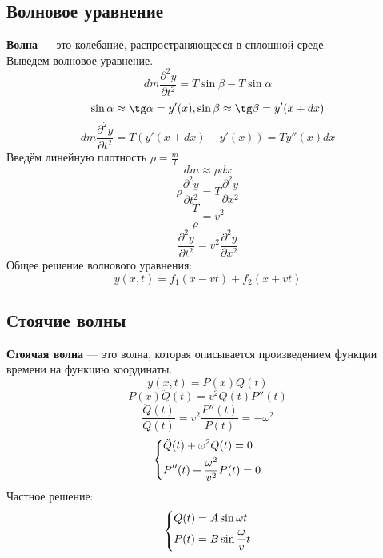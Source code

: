 \documentclass[fleqn,a4paper,12pt,titlepage,finall]{article}
\begin{document}
\subsection{Волновое уравнение}
{\bf Волна} --- это колебание, распространяющееся в сплошной среде. \\
Выведем волновое уравнение.
\[dm \frac{\partial^2 y}{\partial t^2} = T\sin\beta - T\sin\alpha\]
\[\sin\alpha \approx \tg\alpha = y'(x), \sin\beta \approx \tg\beta = y'(x+dx)\]
\[dm \frac{\partial^2 y}{\partial t^2} = T(y'(x+dx) - y'(x)) = Ty''(x)dx\]
Введём линейную плотность $\rho = \frac{m}{l}$
\[dm \approx \rho dx\]
\[\rho \frac{\partial^2 y}{\partial t^2} = T\frac{\partial^2 y}{\partial x^2}\]
\[\frac{T}{\rho} = v^2\]
\[\boxed{\frac{\partial^2 y}{\partial t^2} = v^2\frac{\partial^2 y}{\partial
x^2}}\]
Общее решение волнового уравнения:
\[y(x, t) = f_1(x-vt) + f_2(x+vt)\]
\subsection{Стоячие волны}
{\bf Стоячая волна} --- это волна, которая описывается произведением функции
времени на функцию координаты.
\[y(x, t) = P(x)Q(t)\]
\[P(x)\ddot{Q}(t) = v^2Q(t)P''(t)\]
\[\frac{\ddot{Q}(t)}{Q(t)} = v^2\frac{P''(t)}{P(t)} = -\omega^2\]
\[\begin{dcases}
	\ddot{Q}(t) + \omega^2Q(t) = 0 \\
	P''(t) + \frac{\omega^2}{v^2}P(t) = 0
\end{dcases}\]
Частное решение:
\[\begin{dcases}
	Q(t) = A\sin\omega t \\
	P(t) = B\sin\frac{\omega}{v}t
\end{dcases}\]
\end{document}
